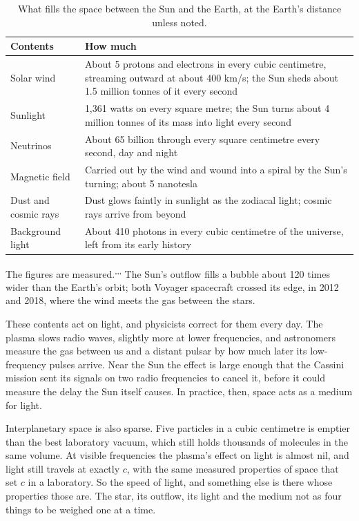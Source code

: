 \begin{table}[h]\centering\small
\caption{What fills the space between the Sun and the Earth, at the Earth's distance unless noted.}
\begin{tabularx}{\linewidth}{@{}l X@{}}\toprule
\textbf{Contents} & \textbf{How much}\\\midrule
Solar wind & About 5 protons and electrons in every cubic centimetre, streaming outward at about 400 km/s; the Sun sheds about 1.5 million tonnes of it every second\\
Sunlight & 1,361 watts on every square metre; the Sun turns about 4 million tonnes of its mass into light every second\\
Neutrinos & About 65 billion through every square centimetre every second, day and night\\
Magnetic field & Carried out by the wind and wound into a spiral by the Sun's turning; about 5 nanotesla\\
Dust and cosmic rays & Dust glows faintly in sunlight as the zodiacal light; cosmic rays arrive from beyond\\
Background light & About 410 photons in every cubic centimetre of the universe, left from its early history\\\bottomrule
\end{tabularx}\label{tab:full}\end{table}

The figures are measured.\textsuperscript{,}\textsuperscript{,}\textsuperscript{,} The Sun's outflow fills a bubble about 120 times wider than the Earth's orbit; both Voyager spacecraft crossed its edge, in 2012 and 2018, where the wind meets the gas between the stars.

These contents act on light, and physicists correct for them every day. The plasma slows radio waves, slightly more at lower frequencies, and astronomers measure the gas between us and a distant pulsar by how much later its low-frequency pulses arrive. Near the Sun the effect is large enough that the Cassini mission sent its signals on two radio frequencies to cancel it, before it could measure the delay the Sun itself causes. In practice, then, space acts as a medium for light.

Interplanetary space is also sparse. Five particles in a cubic centimetre is emptier than the best laboratory vacuum, which still holds thousands of molecules in the same volume. At visible frequencies the plasma's effect on light is almost nil, and light still travels at exactly $c$, with the same measured properties of space that set $c$ in a laboratory. So  the speed of light, and something else is there whose properties those are. The star, its outflow, its light and the medium  not as four things to be weighed one at a time.

